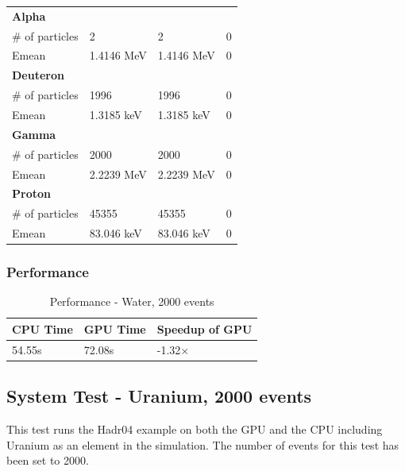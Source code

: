 \documentclass[12pt]{article}
\begin{document}
\begin{table}[H]
\begin{tabular}{llll}
		\bf{Alpha}&&&\\
		\# of particles&2&2&0\\
		Emean&1.4146 MeV&1.4146 MeV&0\\
		
		\bf{Deuteron}&&&\\
		\# of particles&1996&1996&0\\
		Emean&1.3185 keV&1.3185 keV&0\\
		
		\bf{Gamma}&&&\\
		\# of particles&2000&2000&0\\
		Emean&2.2239 MeV&2.2239 MeV&0\\
		
		\bf{Proton}&&&\\
		\# of particles&45355&45355&0\\
		Emean&83.046 keV&83.046 keV&0\\\bottomrule
		
		\end{tabular}
		\end{table}	

	\subsubsection{Performance}
		\begin{table}[H]
		\centering
		\caption{Performance - Water, 2000 events}\label{_acc}
		\begin{tabular}{lll}
		\toprule
		\bf CPU Time&\bf  GPU Time&\bf Speedup of GPU\\\midrule
		54.55s&72.08s&-1.32$\times$\\\bottomrule
		\end{tabular}
		\end{table}

\subsection{System Test - Uranium, 2000 events}
This test runs the Hadr04 example on both the GPU and the CPU including Uranium as an element in the simulation. The number of events for this test has been set to 2000.
\end{document}
